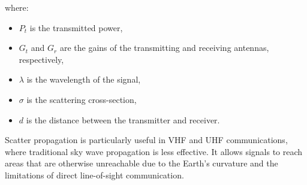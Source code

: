 where:
\begin{itemize}
    \item \(P_t\) is the transmitted power,
    \item \(G_t\) and \(G_r\) are the gains of the transmitting and receiving antennas, respectively,
    \item \(\lambda\) is the wavelength of the signal,
    \item \(\sigma\) is the scattering cross-section,
    \item \(d\) is the distance between the transmitter and receiver.
\end{itemize}

Scatter propagation is particularly useful in VHF and UHF communications, where traditional sky wave propagation is less effective. It allows signals to reach areas that are otherwise unreachable due to the Earth's curvature and the limitations of direct line-of-sight communication.

